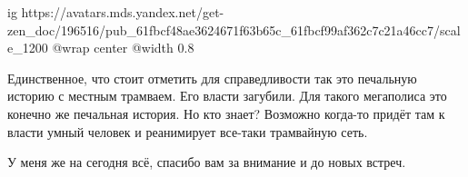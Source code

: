 \ifcmt
  ig https://avatars.mds.yandex.net/get-zen_doc/196516/pub_61fbcf48ae3624671f63b65c_61fbcf99af362c7c21a46cc7/scale_1200
  @wrap center
  @width 0.8
\fi

Единственное, что стоит отметить для справедливости так это печальную историю с
местным трамваем. Его власти загубили. Для такого мегаполиса это конечно же
печальная история. Но кто знает? Возможно когда-то придёт там к власти умный
человек и реанимирует все-таки трамвайную сеть.

У меня же на сегодня всё, спасибо вам за внимание и до новых встреч.
